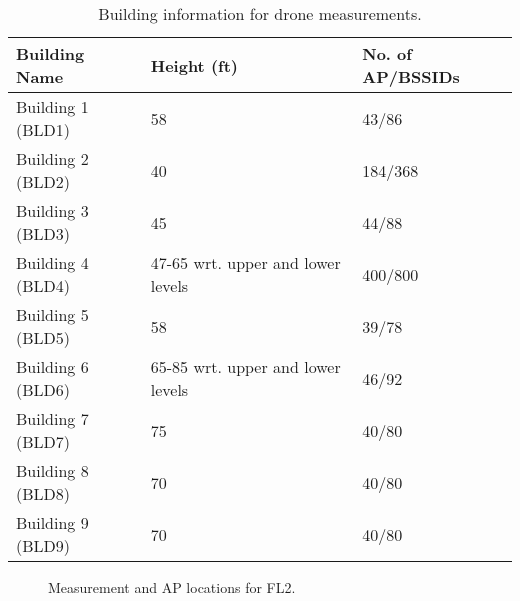 \documentclass[sigconf,10pt]{acmart}
\begin{document}
\begin{table}
	\caption{Building information for drone measurements.}
    \vspace{-1em}
	\centering
	\footnotesize
        \renewcommand{\arraystretch}{1}
	\begin{tabular}{|C{3 cm}|C{2cm}|C{2cm}|} 
 \hline
 \textbf{Building Name} & \textbf{Height (ft)}  & \textbf{No. of AP/BSSIDs}\\
  \hline
  \hline
  Building 1 (BLD1) & 58 & 43/86 \\
  \hline
  Building 2 (BLD2) & 40 & 184/368 \\
  \hline
  Building 3 (BLD3) & 45 & 44/88 \\
  \hline 
  Building 4 (BLD4) & 47-65 wrt. upper and lower levels& 400/800 \\
  \hline
  Building 5 (BLD5) & 58&39/78\\
  \hline
  Building 6 (BLD6) & 65-85 wrt. upper and lower levels& 46/92\\
  \hline 
   Building 7 (BLD7) & 75 & 40/80\\
  \hline
  Building 8 (BLD8) & 70& 40/80\\
  \hline 
  Building 9 (BLD9) & 70& 40/80\\
 \hline
	\end{tabular}
	\label{tab:dronebuildinginfo} 
    \vspace{-1.5em}
\end{table}

\begin{figure}
     \centering
     \begin{subfigure}[Indoor locations and Wi-Fi 6E AP]{  \centering
    \texttt{[image: Figures/chemistry\_indoor\_small.png]}
         \label{Fig:chemistryin}}
    \end{subfigure} \hfill
     \begin{subfigure}[Outdoor locations]{
         \centering
         \texttt{[image: Figures/chemistry\_outdoor\_small.png]}
        \label{Fig:chemistryout}}
     \end{subfigure} 
    \vspace{-1em}
    \caption{Measurement and AP locations for FL2.}
    \label{Fig:meas_locs_closed}
    \vspace{-1.5em}
\end{figure}
\end{document}
